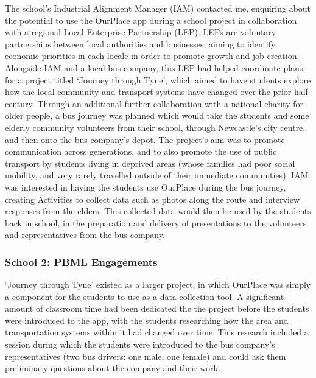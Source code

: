 The school's Industrial Alignment Manager (IAM) contacted me, enquiring about the potential to use the OurPlace app during a school project in collaboration with a regional Local Enterprise Partnership (LEP). LEPs are voluntary partnerships between local authorities and businesses, aiming to identify economic priorities in each locale in order to promote growth and job creation. Alongside IAM and a local bus company, this LEP had helped coordinate plans for a project titled `Journey through Tyne', which aimed to have students explore how the local community and transport systems have changed over the prior half-century. Through an additional further collaboration with a national charity for older people, a bus journey was planned which would take the students and some elderly community volunteers from their school, through Newcastle's city centre, and then onto the bus company's depot. The project's aim was to promote communication across generations, and to also promote the use of public transport by students living in deprived areas (whose families had poor social mobility, and very rarely travelled outside of their immediate communities). IAM was interested in having the students use OurPlace during the bus journey, creating Activities to collect data such as photos along the route and interview responses from the elders. This collected data would then be used by the students back in school, in the preparation and delivery of presentations to the volunteers and representatives from the bus company.

\subsubsection{School 2: PBML Engagements}
`Journey through Tyne' existed as a larger project, in which OurPlace was simply a component for the students to use as a data collection tool. A significant amount of classroom time had been dedicated the the project before the students were introduced to the app, with the students researching how the area and transportation systems within it had changed over time. This research included a session during which the students were introduced to the bus company's representatives (two bus drivers: one male, one female) and could ask them preliminary questions about the company and their work.

